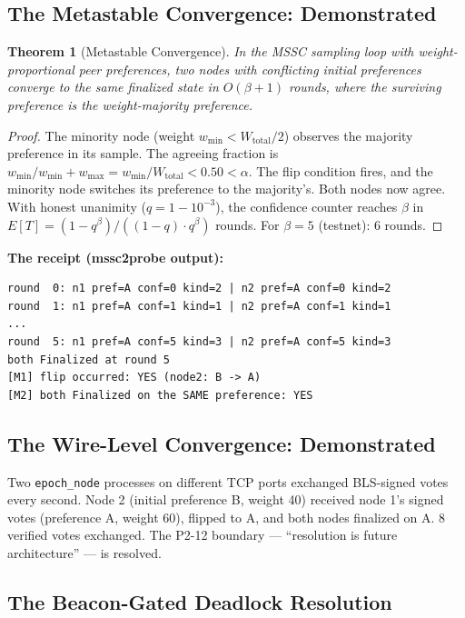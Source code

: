 \documentclass[11pt, a4paper]{article}
\newtheorem{theorem}{Theorem}
\begin{document}
\subsection{The Metastable Convergence: Demonstrated}

\begin{theorem}[Metastable Convergence]
\label{thm:convergence}
In the MSSC sampling loop with weight-proportional peer preferences, two nodes with conflicting initial preferences converge to the same finalized state in $O(\beta + 1)$ rounds, where the surviving preference is the weight-majority preference.
\end{theorem}
\begin{proof}
The minority node (weight $w_{\min} < W_{\text{total}}/2$) observes the majority preference in its sample. The agreeing fraction is $w_{\min} / w_{\min} + w_{\max} = w_{\min} / W_{\text{total}} < 0.50 < \alpha$. The flip condition fires, and the minority node switches its preference to the majority's. Both nodes now agree. With honest unanimity ($q = 1 - 10^{-3}$), the confidence counter reaches $\beta$ in $E[T] = (1 - q^\beta)/((1-q) \cdot q^\beta)$ rounds. For $\beta = 5$ (testnet): 6 rounds.
\end{proof}

\textbf{The receipt (mssc2probe output):}
\begin{verbatim}
round  0: n1 pref=A conf=0 kind=2 | n2 pref=A conf=0 kind=2
round  1: n1 pref=A conf=1 kind=1 | n2 pref=A conf=1 kind=1
...
round  5: n1 pref=A conf=5 kind=3 | n2 pref=A conf=5 kind=3
both Finalized at round 5
[M1] flip occurred: YES (node2: B -> A)
[M2] both Finalized on the SAME preference: YES
\end{verbatim}

\subsection{The Wire-Level Convergence: Demonstrated}

Two \texttt{epoch\_node} processes on different TCP ports exchanged BLS-signed votes every second. Node 2 (initial preference B, weight 40) received node 1's signed votes (preference A, weight 60), flipped to A, and both nodes finalized on A. 8 verified votes exchanged. The P2-12 boundary --- ``resolution is future architecture'' --- is resolved.

\subsection{The Beacon-Gated Deadlock Resolution}
\end{document}
